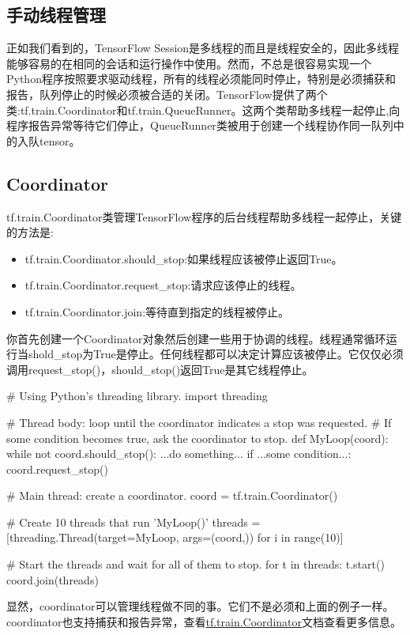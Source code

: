 \subsection{手动线程管理}
正如我们看到的，TensorFlow Session是多线程的而且是线程安全的，因此多线程能够容易的在相同的会话和运行操作中使用。然而，不总是很容易实现一个Python程序按照要求驱动线程，所有的线程必须能同时停止，特别是必须捕获和报告，队列停止的时候必须被合适的关闭。TensorFlow提供了两个类:tf.train.Coordinator和tf.train.QueueRunner。这两个类帮助多线程一起停止,向程序报告异常等待它们停止，QueueRunner类被用于创建一个线程协作同一队列中的入队tensor。
\subsection{Coordinator}
tf.train.Coordinator类管理TensorFlow程序的后台线程帮助多线程一起停止，关键的方法是:
\begin{itemize}
	\item tf.train.Coordinator.should\_stop:如果线程应该被停止返回True。
	\item tf.train.Coordinator.request\_stop:请求应该停止的线程。
	\item tf.train.Coordinator.join:等待直到指定的线程被停止。
\end{itemize}
你首先创建一个Coordinator对象然后创建一些用于协调的线程。线程通常循环运行当shold\_stop为True是停止。任何线程都可以决定计算应该被停止。它仅仅必须调用request\_stop()，should\_stop()返回True是其它线程停止。
\begin{python}
# Using Python's threading library.
import threading

# Thread body: loop until the coordinator indicates a stop was requested.
# If some condition becomes true, ask the coordinator to stop.
def MyLoop(coord):
    while not coord.should_stop():
    ...do something...
    if ...some condition...:
        coord.request_stop()

# Main thread: create a coordinator.
coord = tf.train.Coordinator()

# Create 10 threads that run 'MyLoop()'
threads = [threading.Thread(target=MyLoop, args=(coord,)) for i in range(10)]

# Start the threads and wait for all of them to stop.
for t in threads:
  t.start()
coord.join(threads)
\end{python}
显然，coordinator可以管理线程做不同的事。它们不是必须和上面的例子一样。coordinator也支持捕获和报告异常，查看\href{https://www.tensorflow.org/api_docs/python/tf/train/Coordinator}{tf.train.Coordinator}文档查看更多信息。
